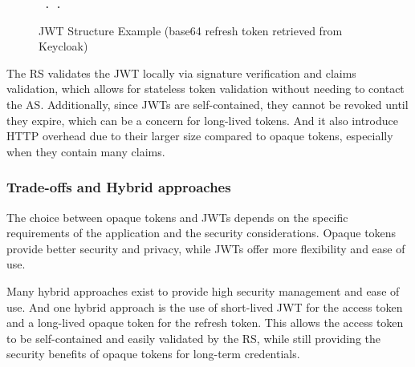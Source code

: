 \documentclass[../memoire.tex]{subfiles}
\begin{document}
\begin{figure}[htp]
    \centering
    \begin{tcolorbox}[width=\textwidth, colframe=gray!20, colback=white, arc=2pt, boxrule=0.5pt, fonttitle=\bfseries] 
        \texttt{\small%
          \textcolor{red}{}.%
        .%
        \textcolor{blue}{}%
        }
    \end{tcolorbox}
    \caption{JWT Structure Example (base64 refresh token retrieved from Keycloak)}
    \label{fig:jwt_exple}
\end{figure}


The RS validates the JWT locally via signature verification and claims validation, which allows for stateless token validation without needing to contact the AS. Additionally, since JWTs are self-contained, they cannot be revoked until they expire, which can be a concern for long-lived tokens. And it also introduce HTTP overhead due to their larger size compared to opaque tokens, especially when they contain many claims.

\subsubsection*{Trade-offs and Hybrid approaches}

The choice between opaque tokens and JWTs depends on the specific requirements of the application and the security considerations. Opaque tokens provide better security and privacy, while JWTs offer more flexibility and ease of use. 

Many hybrid approaches exist to provide high security management and ease of use. And one hybrid approach is the use of short-lived JWT for the access token and a long-lived opaque token for the refresh token. This allows the access token to be self-contained and easily validated by the RS, while still providing the security benefits of opaque tokens for long-term credentials. 
\end{document}
